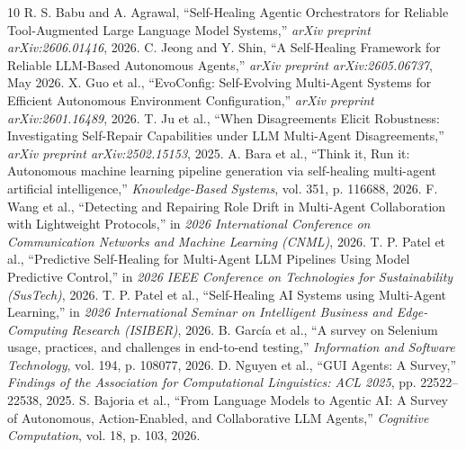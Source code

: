 \documentclass[conference]{IEEEtran}
\begin{document}
\begin{thebibliography}{10}
 R. S. Babu and A. Agrawal, ``Self-Healing Agentic Orchestrators for Reliable Tool-Augmented Large Language Model Systems,'' \textit{arXiv preprint arXiv:2606.01416}, 2026.
 C. Jeong and Y. Shin, ``A Self-Healing Framework for Reliable LLM-Based Autonomous Agents,'' \textit{arXiv preprint arXiv:2605.06737}, May 2026.
 X. Guo et al., ``EvoConfig: Self-Evolving Multi-Agent Systems for Efficient Autonomous Environment Configuration,'' \textit{arXiv preprint arXiv:2601.16489}, 2026.
 T. Ju et al., ``When Disagreements Elicit Robustness: Investigating Self-Repair Capabilities under LLM Multi-Agent Disagreements,'' \textit{arXiv preprint arXiv:2502.15153}, 2025.
 A. Bara et al., ``Think it, Run it: Autonomous machine learning pipeline generation via self-healing multi-agent artificial intelligence,'' \textit{Knowledge-Based Systems}, vol. 351, p. 116688, 2026.
 F. Wang et al., ``Detecting and Repairing Role Drift in Multi-Agent Collaboration with Lightweight Protocols,'' in \textit{2026 International Conference on Communication Networks and Machine Learning (CNML)}, 2026.
 T. P. Patel et al., ``Predictive Self-Healing for Multi-Agent LLM Pipelines Using Model Predictive Control,'' in \textit{2026 IEEE Conference on Technologies for Sustainability (SusTech)}, 2026.
 T. P. Patel et al., ``Self-Healing AI Systems using Multi-Agent Learning,'' in \textit{2026 International Seminar on Intelligent Business and Edge-Computing Research (ISIBER)}, 2026.
 B. Garc\'ia et al., ``A survey on Selenium usage, practices, and challenges in end-to-end testing,'' \textit{Information and Software Technology}, vol. 194, p. 108077, 2026.
 D. Nguyen et al., ``GUI Agents: A Survey,'' \textit{Findings of the Association for Computational Linguistics: ACL 2025}, pp. 22522--22538, 2025.
 S. Bajoria et al., ``From Language Models to Agentic AI: A Survey of Autonomous, Action-Enabled, and Collaborative LLM Agents,'' \textit{Cognitive Computation}, vol. 18, p. 103, 2026.
\end{thebibliography}
\end{document}
